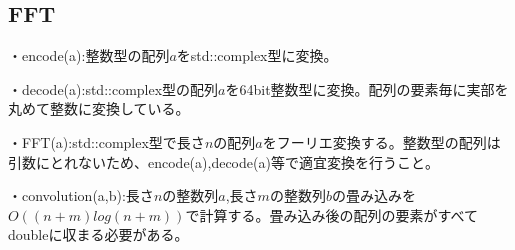 \subsection{FFT}


・encode(a):整数型の配列$a$をstd::complex型に変換。

・decode(a):std::complex型の配列$a$を64bit整数型に変換。配列の要素毎に実部を丸めて整数に変換している。

・FFT(a):std::complex型で長さ$n$の配列$a$をフーリエ変換する。整数型の配列は引数にとれないため、encode(a),decode(a)等で適宜変換を行うこと。

・convolution(a,b):長さ$n$の整数列$a$,長さ$m$の整数列$b$の畳み込みを$O((n+m)log(n+m))$で計算する。畳み込み後の配列の要素がすべてdoubleに収まる必要がある。

